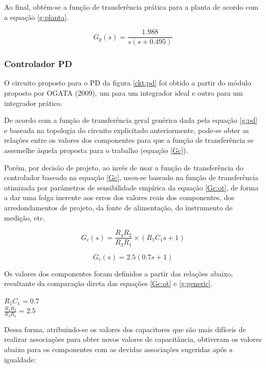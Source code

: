 Ao final, obtém-se a função de transferência prática para a planta de acordo com a equação \ref{g:planta}.

\begin{equation} \label{g:planta}
    G_p(s) = \frac{1.988}{s(s+0.495)}
\end{equation}


\subsubsection{Controlador PD}

O circuito proposto para o PD da figura \ref{ckt:pd} foi obtido a partir do módulo proposto por OGATA (2009), um para um integrador ideal e outro para um integrador prático.



De acordo com a função de transferência geral genérica dada pela equação \ref{g:pd} e baseada na topologia do circuito explicitado anteriormente, pode-se obter as relações entre os valores dos componentes para que a função de transferência se assemelhe àquela proposta para o trabalho (equação \ref{Gc}).

Porém, por decisão de projeto, ao invés de usar a função de transferência do controlador baseado na equação \ref{Gc}, usou-se baseado na função de transferência otimizada por parâmetros de sensibilidade empírica da equação \ref{Gc:ot}, de forma a dar uma folga inerente aos erros dos valores reais dos componentes, dos arredondamentos de projeto, da fonte de alimentação, do instrumento de medição, etc. 

\begin{equation} \label{g:pd}
    G_c(s) = \frac{R_4R_2}{R_3R_1}\times(R_1C_1s+1)
\end{equation}

\begin{equation} \label{Gc:ot}
    G_c(s) = 2.5(0.7s+1)
\end{equation}

Os valores dos componentes foram definidos a partir das relações abaixo, resultante da comparação direta das equações \ref{Gc:ot} e \ref{g:generic}.

\begin{center}
    $R_1C_1 = 0.7$ \vspace{5pt}\\
    $\frac{R_4R_2}{R_3R_1} = 2.5$
\end{center}

Dessa forma, atribuindo-se os valores dos capacitores que são mais difíceis de realizar associações para obter novos valores de capacitância, obtiveram os valores abaixo para os componentes com as devidas associações sugeridas após a igualdade:

